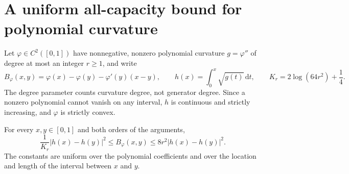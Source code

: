 
\section{A uniform all-capacity bound for polynomial curvature}
\label{sec:poly-allcap-new}

Let $\varphi\in C^2([0,1])$ have nonnegative, nonzero polynomial curvature
$g=\varphi''$ of degree at most an integer $r\ge1$, and write
\[
 B_\varphi(x,y)=\varphi(x)-\varphi(y)-\varphi'(y)(x-y),
 \qquad h(x)=\int_0^x\sqrt{g(t)}\,\mathrm dt,
 \qquad K_r=2\log(64r^2)+\frac14.
\]
The degree parameter counts curvature degree, not generator degree.
Since a nonzero polynomial cannot vanish on any interval, $h$ is continuous
and strictly increasing, and $\varphi$ is strictly convex.

\begin{lemma}
\label{lem:poly-h-new}
For every $x,y\in[0,1]$ and both orders of the arguments,
\begin{equation}
 \frac{1}{K_r}|h(x)-h(y)|^2
 \le B_\varphi(x,y)
 \le 8r^2|h(x)-h(y)|^2.
 \label{eq:poly-h-new}
\end{equation}
The constants are uniform over the polynomial coefficients and over the
location and length of the interval between $x$ and $y$.
\end{lemma}

